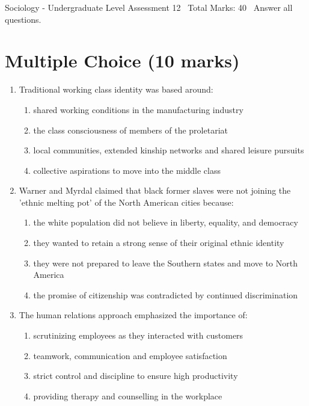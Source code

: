 \documentclass[12pt]{article}
\begin{document}
\begin{center}
Sociology - Undergraduate Level Assessment 12 \
Total Marks: 40 \
Answer all questions.
\end{center}

\section*{Multiple Choice (10 marks)}
\begin{enumerate}[label=\arabic*.]
\item Traditional working class identity was based around:
\begin{enumerate}[label=(\alph*)]
    \item shared working conditions in the manufacturing industry
    \item the class consciousness of members of the proletariat
    \item local communities, extended kinship networks and shared leisure pursuits
    \item collective aspirations to move into the middle class
\end{enumerate}
\item Warner and Myrdal claimed that black former slaves were not joining the 'ethnic melting pot' of the North American cities because:
\begin{enumerate}[label=(\alph*)]
    \item the white population did not believe in liberty, equality, and democracy
    \item they wanted to retain a strong sense of their original ethnic identity
    \item they were not prepared to leave the Southern states and move to North America
    \item the promise of citizenship was contradicted by continued discrimination
\end{enumerate}
\item The human relations approach emphasized the importance of:
\begin{enumerate}[label=(\alph*)]
    \item scrutinizing employees as they interacted with customers
    \item teamwork, communication and employee satisfaction
    \item strict control and discipline to ensure high productivity
    \item providing therapy and counselling in the workplace
\end{enumerate}

\end{enumerate}
\end{document}
